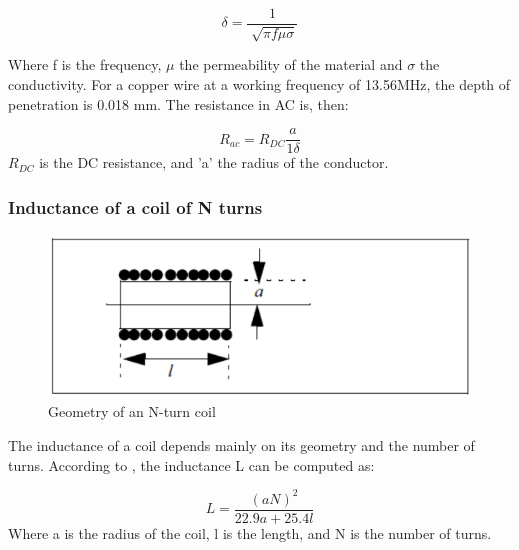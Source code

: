 \documentclass{article} %
\begin{document}
\begin{multicols}{2}
\begin{equation}
{\delta = \frac{1}{\sqrt[]{\pi f \mu \sigma }}}
\end{equation}

Where f is the frequency, $\mu$ the permeability of the material and $\sigma$ the conductivity. For a copper wire at a working frequency of 13.56MHz, the depth of penetration is 0.018 mm. The resistance in AC is, then:

\begin{equation}
{R_{ac} = R_{DC} \frac{a}{1\delta}}
\end{equation}
$R_{DC}$ is the DC resistance, and 'a' the radius of the conductor.



\subsubsection{Inductance of a coil of N turns}

\begin{figure}[H]
\centering
\includegraphics[scale=0.3]{Images/ImagenesTesina/antena/Bobina_N_Espiras.png}
\caption{Geometry of an N-turn coil}
\label{fig:N_esp}
\end{figure}

The inductance of a coil depends mainly on its geometry and the number of turns. 
According to \cite{c9}, the inductance L can be computed as:

\begin{equation}
{L = \frac{(aN)^2}{22.9 a+25.4 l}}
\end{equation}
\newline
Where a is the radius of the coil, l is the length, and N is the number of turns.



\end{multicols}
\end{document}
